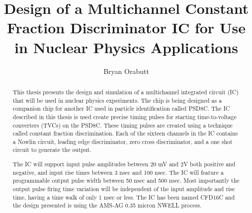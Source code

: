 \documentclass[12pt,oneside,final]{siuethesis}
\author{Bryan Orabutt}
\title{Design of a Multichannel Constant Fraction Discriminator IC for Use in Nuclear Physics Applications}
\theoremstyle{definition}
\begin{document}
\maketitle 

\frontmatter %

\copyrightpage %

\begin{abstract}
\par This thesis presents the design and simulation of a multichannel integrated circuit (IC) that will be used in nuclear physics experiments. The chip is being designed as a companion chip for another IC used in particle identification called PSD8C. The IC described in this thesis is used create precise timing pulses for starting time-to-voltage converters (TVCs) on the PSD8C. These timing pulses are created using a technique called constant fraction discrimination. Each of the sixteen channels in the IC contains a Nowlin circuit, leading edge discriminator, zero cross discriminator, and a one shot circuit to generate the output. \par The IC will support input pulse amplitudes between 20 mV and 2V both positive and negative, and input rise times between 3 nsec and 100 nsec. The IC will feature a programmable output pulse width between 50 nsec and 500 nsec. Most importantly the output pulse firing time variation will be independent of the input amplitude and rise time, having a time walk of only 1 nsec or less. The IC has been named CFD16C and the design presented is using the AMS-AG 0.35 micron NWELL process.

\end{abstract}
\end{document}
